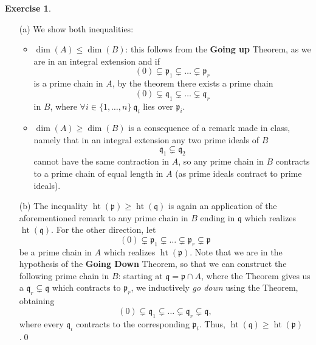 \documentclass[a4paper]{article}
\theoremstyle{definition}
\theoremstyle{definition}
\theoremstyle{remark}
\theoremstyle{definition}
\newtheorem{exercise}{Exercise}[section]
\begin{document}
\begin{exercise}\


	\begin{itemize}
	\item[(a)] We show both inequalities:
		\begin{itemize}
			\item $\operatorname{dim}(A)\leq\operatorname{dim}(B)$: this follows from the \textbf{Going up} Theorem, as we are in an integral extension and if
				$$(0)\subsetneq\mathfrak{p}_1\subsetneq\dots\subsetneq\mathfrak{p}_r$$ is a prime chain in $A$, by
				the theorem there exists a prime chain $$(0)\subsetneq\mathfrak{q}_1\subsetneq\dots\subsetneq\mathfrak{q}_r$$ in $B$, where $\forall
				i\in\{1,\dots,n\}\:\mathfrak{q}_i$ lies over
				$\mathfrak{p}_i$.
			\item $\operatorname{dim}(A)\geq\operatorname{dim}(B)$ is a consequence of a remark made in class, namely that in an integral extension any two prime ideals of $B$
				$$\mathfrak{q}_1\subsetneq\mathfrak{q}_2$$ cannot have the same contraction in $A$, so any prime chain in $B$ contracts to a prime
				chain of equal
				length in $A$ (as prime ideals contract to prime ideals).
		\end{itemize}
	\item[(b)] The inequality $\operatorname{ht}(\mathfrak{p})\geq\operatorname{ht}(\mathfrak{q})$ is again an application of the aforementioned remark to any prime chain in $B$ ending in
		$\mathfrak{q}$ which realizes
		$\operatorname{ht}(\mathfrak{q})$. For the other direction, let $$(0)\subsetneq\mathfrak{p}_1\subsetneq\dots\subsetneq\mathfrak{p}_r\subsetneq\mathfrak{p}$$ be a
		prime chain in $A$ which realizes $\operatorname{ht}\left( \mathfrak{p} \right) $. Note that we are in the hypothesis of the \textbf{Going Down} Theorem, so that we can
		construct the following prime chain in $B$: starting at $\mathfrak{q}=\mathfrak{p}\cap A$, where the Theorem gives us a $\mathfrak{q}_r\subsetneq\mathfrak{q}$ which
		contracts to $\mathfrak{p}_r$, we inductively \textit{go down} using the Theorem, obtaining
		$$(0)\subsetneq\mathfrak{q}_1\subsetneq\dots\subsetneq\mathfrak{q}_r\subsetneq\mathfrak{q},$$ where every $\mathfrak{q}_i$ contracts to the corresponding
		$\mathfrak{p}_i$. Thus, $\operatorname{ht}{(\mathfrak{q})}\geq\operatorname{ht}{(\mathfrak{p})}$.\qed
	\end{itemize}
\end{exercise}
\end{document}
